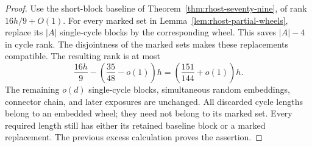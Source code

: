 \begin{proof}
Use the short-block baseline of Theorem~\ref{thm:rhost-seventy-nine}, of rank $16h/9+O(1)$.
For every marked set in Lemma~\ref{lem:rhost-partial-wheels}, replace its $|A|$ single-cycle blocks by the corresponding wheel.
This saves $|A|-4$ in cycle rank.
The disjointness of the marked sets makes these replacements compatible.
The resulting rank is at most
\[
 \frac{16h}{9}-\left(\frac{35}{48}-o(1)\right)h
 =\left(\frac{151}{144}+o(1)\right)h.
\]
The remaining $o(d)$ single-cycle blocks, simultaneous random embeddings, connector chain, and later exposures are unchanged.
All discarded cycle lengths belong to an embedded wheel; they need not belong to its marked set.
Every required length still has either its retained baseline block or a marked replacement.
The previous excess calculation proves the assertion.
\end{proof}
